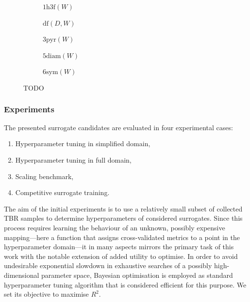 \begin{figure}[h]
	\centering
	\begin{subfigure}[b]{0.20\textwidth}
		\centering
		{\footnotesize {}}
		\caption{$\text{1h3f}(W)$}
	\end{subfigure}\hfill%
	\begin{subfigure}[b]{0.15\textwidth}
		\centering
		{\footnotesize {}}
		\caption{$\text{df}(D,W)$}
	\end{subfigure}\hfill%
	\begin{subfigure}[b]{0.15\textwidth}
		\centering
		{\footnotesize {}}
		\caption{$\text{3pyr}(W)$}
	\end{subfigure}\hfill%
	\begin{subfigure}[b]{0.20\textwidth}
		\centering
		{\footnotesize {}}
		\caption{$\text{5diam}(W)$}
	\end{subfigure}\hfill%
	\begin{subfigure}[b]{0.20\textwidth}
		\centering
		{\footnotesize {}} %
		\caption{$\text{6sym}(W)$}
	\end{subfigure}

	\caption{TODO}
	\label{fig:neural-net-architectures}
\end{figure}

\subsubsection{Experiments}

The presented surrogate candidates are evaluated in four experimental cases:

\begin{enumerate}
	
	\item Hyperparameter tuning in simplified domain,

	\item Hyperparameter tuning in full domain,

	\item Scaling benchmark,

	\item Competitive surrogate training.
\end{enumerate}

The aim of the initial experiments is to use a relatively small subset of
collected TBR samples to determine hyperparameters of considered surrogates.
Since this process requires learning the behaviour of an unknown, possibly
expensive mapping---here a function that assigns cross-validated metrics to a
point in the hyperparameter domain---it in many aspects mirrors
the primary task of this work with the notable extension of added utility
to optimise. In order to avoid undesirable exponential slowdown in exhaustive
searches of a possibly high-dimensional parameter space, Bayesian
optimisation is employed as standard hyperparameter tuning algorithm that is considered
efficient for this purpose. We set its objective to maximise $R^2$.


